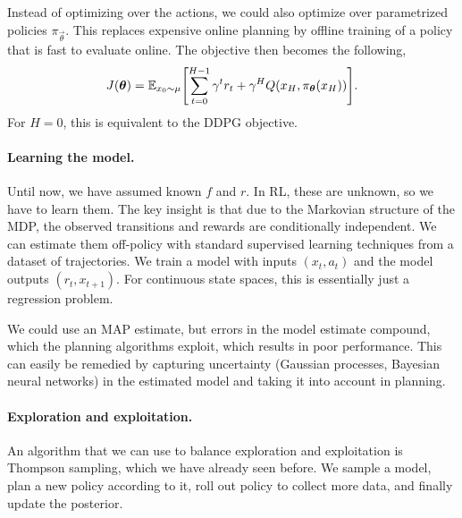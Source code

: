 Instead of optimizing over the actions, we could also optimize over
parametrized policies $\pi_{\vec{\theta}}$. This replaces expensive online
planning by offline training of a policy that is fast to evaluate online. The
objective then becomes the following, \[
  J(\vec{\theta}) = \E_{x_0 \sim \mu} \lft[ \sum_{t=0}^{H-1} \gamma^t r_t + \gamma^H Q(x_H, \pi_{\vec{\theta}}(x_H)) \rgt]
.\]
For $H=0$, this is equivalent to the DDPG objective.

\paragraph{Learning the model.}

Until now, we have assumed known $f$ and $r$. In RL, these are unknown, so we
have to learn them. The key insight is that due to the Markovian structure of
the MDP, the observed transitions and rewards are conditionally independent. We
can estimate them off-policy with standard supervised learning techniques from
a dataset of trajectories. We train a model with inputs $(x_t,a_t)$ and the
model outputs $(r_t,x_{t+1})$. For continuous state spaces, this is essentially
just a regression problem.

We could use an MAP estimate, but errors in the model estimate compound, which
the planning algorithms exploit, which results in poor performance. This can
easily be remedied by capturing uncertainty (Gaussian processes, Bayesian
neural networks) in the estimated model and taking it into account in planning.

\paragraph{Exploration and exploitation.}

An algorithm that we can use to balance exploration and exploitation is
Thompson sampling, which we have already seen before. We sample a model, plan a
new policy according to it, roll out policy to collect more data, and finally
update the posterior.
